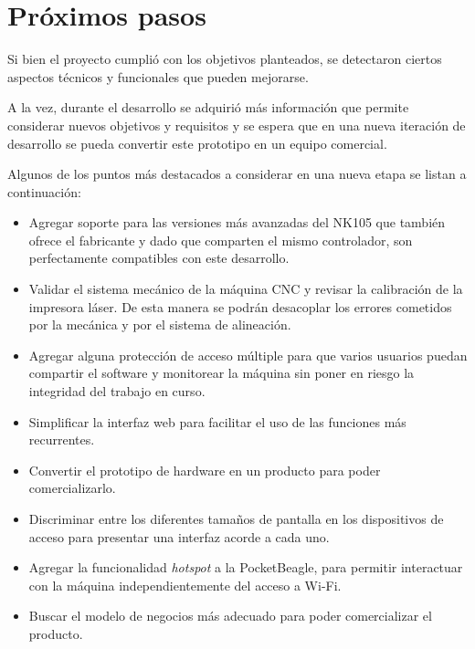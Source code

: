 \section{Próximos pasos}

Si bien el proyecto cumplió con los objetivos planteados, se detectaron ciertos aspectos técnicos y funcionales que pueden mejorarse.\par
A la vez, durante el desarrollo se adquirió más información que permite considerar nuevos objetivos y requisitos y se espera que en una nueva iteración de desarrollo se pueda convertir este prototipo en un equipo comercial.\par
Algunos de los puntos más destacados a considerar en una nueva etapa se listan a continuación:

\begin{itemize}
\item{Agregar soporte para las versiones más avanzadas del NK105 que también ofrece el fabricante y dado que comparten el mismo controlador, son perfectamente compatibles con este desarrollo.}

\item{Validar el sistema mecánico de la máquina CNC y revisar la calibración de la impresora láser. De esta manera se podrán desacoplar los errores cometidos por la mecánica y por el sistema de alineación.}

\item{Agregar alguna protección de acceso múltiple para que varios usuarios puedan compartir el software y monitorear la máquina sin poner en riesgo la integridad del trabajo en curso.}

\item{Simplificar la interfaz web para facilitar el uso de las funciones más recurrentes.}

\item{Convertir el prototipo de hardware en un producto para poder comercializarlo.}

\item{Discriminar entre los diferentes tamaños de pantalla en los dispositivos de acceso para presentar una interfaz acorde a cada uno.}

\item{Agregar la funcionalidad \textit{hotspot} a la PocketBeagle, para permitir interactuar con la máquina independientemente del acceso a Wi-Fi.}

\item{Buscar el modelo de negocios más adecuado para poder comercializar el producto.}

\end{itemize}
